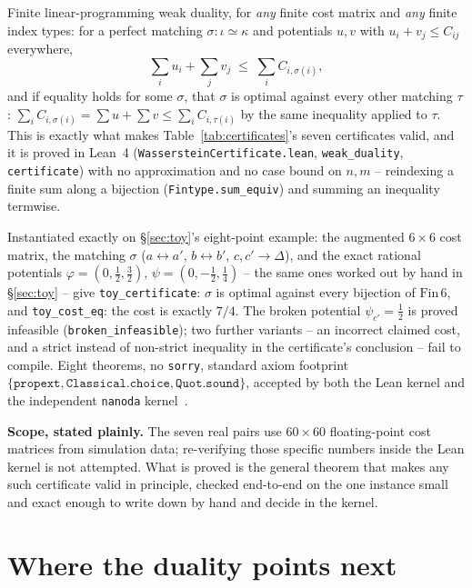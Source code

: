 \documentclass[11pt,a4paper]{article}
\newcommand{\lean}[1]{\texttt{\small #1}}
\begin{document}
Finite linear-programming weak duality, for \emph{any} finite cost matrix and \emph{any} finite index
types: for a perfect matching $\sigma:\iota\simeq\kappa$ and potentials $u,v$ with
$u_i+v_j\le C_{ij}$ everywhere,
\begin{equation}
\textstyle\sum_i u_i + \sum_j v_j \;\le\; \sum_i C_{i,\sigma(i)},
\end{equation}
and if equality holds for some $\sigma$, that $\sigma$ is optimal against every other matching $\tau$:
$\sum_i C_{i,\sigma(i)} = \sum u+\sum v \le \sum_i C_{i,\tau(i)}$ by the same inequality applied to
$\tau$. This is exactly what makes Table~\ref{tab:certificates}'s seven certificates valid, and it is
proved in Lean~4 (\lean{WassersteinCertificate.lean}, \lean{weak\_duality}, \lean{certificate}) with no
approximation and no case bound on $n,m$ -- reindexing a finite sum along a bijection
(\lean{Fintype.sum\_equiv}) and summing an inequality termwise.

Instantiated exactly on \S\ref{sec:toy}'s eight-point example: the augmented $6\times6$ cost matrix, the
matching $\sigma$ ($a\leftrightarrow a'$, $b\leftrightarrow b'$, $c,c'\to\Delta$), and the exact rational
potentials $\varphi=(0,\tfrac12,\tfrac32)$, $\psi=(0,-\tfrac12,\tfrac14)$ -- the same ones worked out by
hand in \S\ref{sec:toy} -- give \lean{toy\_certificate}: $\sigma$ is optimal against every bijection of
$\mathrm{Fin}\,6$, and \lean{toy\_cost\_eq}: the cost is exactly $7/4$. The broken potential
$\psi_{c'}=\tfrac12$ is proved infeasible (\lean{broken\_infeasible}); two further variants -- an
incorrect claimed cost, and a strict instead of non-strict inequality in the certificate's conclusion --
fail to compile. Eight theorems, no \lean{sorry}, standard axiom footprint
$\{\texttt{propext},\allowbreak\texttt{Classical.choice},\allowbreak\texttt{Quot.sound}\}$, accepted by
both the Lean kernel and the independent \texttt{nanoda} kernel~\cite{Comparator}.

\begin{keybox}
\textbf{Scope, stated plainly.} The seven real pairs use $60\times60$ floating-point cost matrices from
simulation data; re-verifying those specific numbers inside the Lean kernel is not attempted. What is
proved is the general theorem that makes any such certificate valid in principle, checked end-to-end on
the one instance small and exact enough to write down by hand and decide in the kernel.
\end{keybox}

\section{Where the duality points next}
\label{sec:directions}
\end{document}
